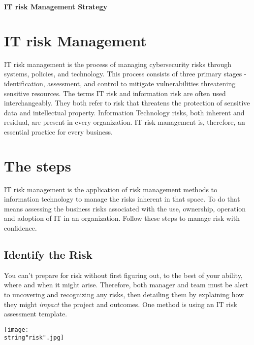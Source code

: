 \documentclass[a4paper,12pt]{article}
\begin{document}
\textbf{IT risk Management Strategy}

\tableofcontents
\clearpage

\section{IT risk Management}

IT risk management is the process of managing cybersecurity risks through systems, policies, and technology. This process consists of three primary stages - identification, assessment, and control to mitigate vulnerabilities threatening sensitive resources.
The terms IT risk and information risk are often used interchangeably. They both refer to risk that threatens the protection of sensitive data and intellectual property. Information Technology risks, both inherent and residual, are present in every organization. IT risk management is, therefore, an essential practice for every business.

 \clearpage 

\section{The steps}

IT risk management is the application of risk management methods to information technology to manage the risks inherent in that space. To do that means assessing the business risks associated with the use, ownership, operation and adoption of IT in an organization. Follow these steps to manage risk with confidence.

\subsection{Identify the Risk}
You can’t prepare for risk without first figuring out, to the best of your ability, where and when it might arise. Therefore, both manager and team must be alert to uncovering and recognizing any risks, then detailing them by explaining how they might \emph{impact} the project and outcomes. One method is using an IT risk assessment template.


\begin{center}
\vspace*{\fill}\texttt{[image: \\string"risk".jpg]}\vspace*{\fill}
\par\end{center}
\end{document}
